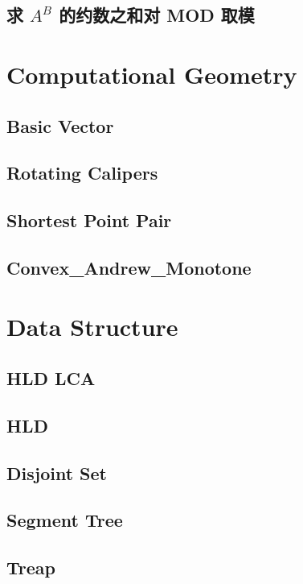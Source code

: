 	\subsection{求 $A^B$ 的约数之和对 MOD 取模}
		
\section{Computational Geometry}
	\subsection{Basic Vector}
		
	\subsection{Rotating Calipers}
		
	\subsection{Shortest Point Pair}
		
	\subsection{Convex\_Andrew\_Monotone}
		
\section{Data Structure}
	\subsection{HLD LCA}
		
	\subsection{HLD}
		
	\subsection{Disjoint Set}
		
	\subsection{Segment Tree}
		
	\subsection{Treap}
		
